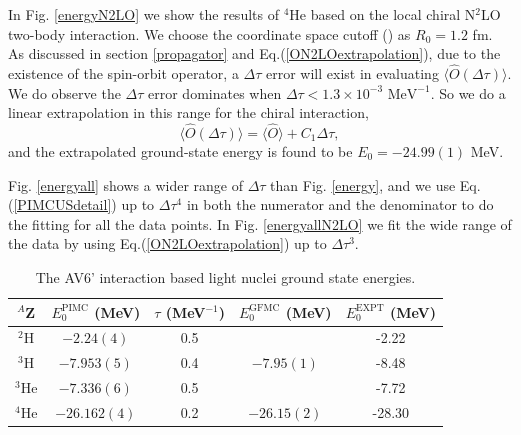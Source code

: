\documentclass[12pt,letterpaper,UTF8]{report}
\begin{document}
In Fig. \ref{energyN2LO} we show the results of $^4$He based on the local chiral N$^2$LO two-body interaction. We choose the coordinate space cutoff (\cite{Gerzerlis14a}) as $R_0=1.2$ fm.
As discussed in section \ref{propagator} and Eq.(\ref{ON2LOextrapolation}), due to the existence of the spin-orbit operator, a $\Delta \tau$ error will exist in evaluating $\langle \hat{O} (\Delta \tau) \rangle$.
We do observe the $\Delta \tau$ error dominates when $\Delta \tau < 1.3 \times 10^{-3} \textrm{ MeV}^{-1}$. So we do a linear extrapolation in this range for the chiral interaction,
\begin{equation}
\langle \hat{O} (\Delta \tau) \rangle
= \langle \hat{O} \rangle
+  C_{1} \Delta \tau,
\label{OextrapolationO1}
\end{equation}
and the extrapolated ground-state energy is found to be $E_0=-24.99(1)$ MeV.

Fig. \ref{energyall} shows a wider range of $\Delta \tau$ than Fig. \ref{energy}, and we use Eq.(\ref{PIMCUSdetail}) up to $\Delta \tau^4$ in both the numerator and the denominator to do the fitting for all the data points.
In Fig. \ref{energyallN2LO} we fit the wide range of the data by using Eq.(\ref{ON2LOextrapolation}) up to $\Delta \tau^3$.

\begin{table}[htbp!]
\caption[PIMC Results for the Ground State Energy of Light Nuclei Based on the AV6' Interaction]{The AV6' interaction based light nuclei ground state energies.}
\label{TablePIMC2}%
\begin{tabular*}   {1.0\textwidth}{@{\extracolsep{\fill}}ccccc}
\toprule
$^A$Z   & $E^{\text{PIMC}}_0$ (MeV) & $\tau$ (MeV$^{-1}$) & $E^{\textrm{GFMC}}_0$ (MeV)  & $E^{\textrm{EXPT}}_0$ (MeV) \\
\midrule
$^2$H  & $-2.24(4)$  & 0.5 & &  -2.22 \\ \midrule
$^3$H  & $-7.953(5)$  & 0.4 & $-7.95(1)$ & -8.48 \\ \midrule
$^3$He  & $-7.336(6)$  & 0.5 & & -7.72  \\ \midrule
$^4$He  & $-26.162(4)$  & 0.2 & $-26.15(2)$ & -28.30  \\
\bottomrule
\end{tabular*}
\end{table}
\end{document}
